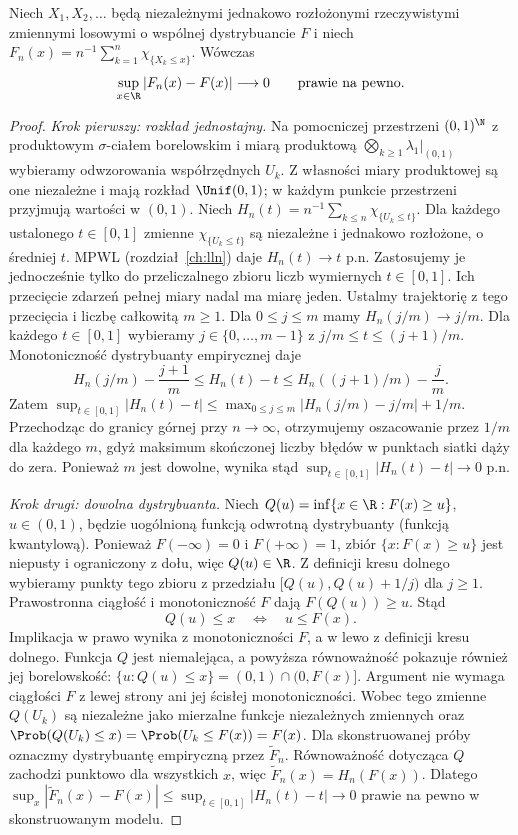 \begin{twierdzenie}
Niech $X_1,X_2,\ldots$ będą niezależnymi
jednakowo rozłożonymi rzeczywistymi zmiennymi losowymi
o wspólnej dystrybuancie $F$ i niech
$F_n(x)=n^{-1}\sum_{k=1}^n\chi_{\{X_k\leq x\}}$.
Wówczas
\[
\sup_{x\in\R}|F_n(x)-F(x)|\longrightarrow0
\qquad\text{prawie na pewno}.
\]
\end{twierdzenie}
\begin{proof}
\emph{Krok pierwszy: rozkład jednostajny.}
Na pomocniczej przestrzeni $(0,1)^{\N}$ z produktowym
$\sigma$-ciałem borelowskim i miarą produktową
$\bigotimes_{k\geq1}\lambda_1|_{(0,1)}$
wybieramy odwzorowania współrzędnych $U_k$.
Z własności miary produktowej są one niezależne
i mają rozkład $\Unif(0,1)$; w każdym punkcie
przestrzeni przyjmują wartości w $(0,1)$. Niech
$H_n(t)=n^{-1}\sum_{k\leq n}\chi_{\{U_k\leq t\}}$.
Dla każdego ustalonego $t\in[0,1]$ zmienne
$\chi_{\{U_k\leq t\}}$ są niezależne i jednakowo
rozłożone, o średniej $t$. MPWL
(rozdział~\ref{ch:lln}) daje $H_n(t)\to t$ p.n. Zastosujemy je
jednocześnie tylko do przeliczalnego zbioru
liczb wymiernych $t\in[0,1]$. Ich przecięcie
zdarzeń pełnej miary nadal ma miarę jeden.
Ustalmy trajektorię z tego przecięcia i
liczbę całkowitą $m\geq1$. Dla
$0\leq j\leq m$ mamy
$H_n(j/m)\to j/m$.
Dla każdego $t\in[0,1]$ wybieramy
$j\in\{0,\ldots,m-1\}$ z $j/m\leq t\leq(j+1)/m$.
Monotoniczność
dystrybuanty empirycznej daje
\[
H_n(j/m)-\frac{j+1}{m}\leq H_n(t)-t
\leq H_n((j+1)/m)-\frac{j}{m}.
\]
Zatem
$\sup_{t\in[0,1]}|H_n(t)-t|\leq
\max_{0\leq j\leq m}|H_n(j/m)-j/m|+1/m$.
Przechodząc do granicy górnej przy $n\to\infty$,
otrzymujemy oszacowanie przez $1/m$ dla każdego $m$,
gdyż maksimum skończonej liczby błędów w punktach
siatki dąży do zera.
Ponieważ $m$ jest dowolne, wynika stąd
$\sup_{t\in[0,1]}|H_n(t)-t|\to0$ p.n.

\emph{Krok drugi: dowolna dystrybuanta.}
Niech $Q(u)=\inf\{x\in\R:F(x)\geq u\}$,
$u\in(0,1)$, będzie uogólnioną funkcją odwrotną
dystrybuanty (funkcją kwantylową).
Ponieważ $F(-\infty)=0$ i $F(+\infty)=1$, zbiór
$\{x:F(x)\geq u\}$ jest niepusty i ograniczony z dołu,
więc $Q(u)\in\R$.
Z definicji kresu dolnego wybieramy punkty tego
zbioru z przedziału $[Q(u),Q(u)+1/j)$ dla $j\geq1$.
Prawostronna ciągłość i monotoniczność $F$ dają
$F(Q(u))\geq u$. Stąd
\[
Q(u)\leq x\quad\Longleftrightarrow\quad u\leq F(x).
\]
Implikacja w prawo wynika z monotoniczności $F$,
a w lewo z definicji kresu dolnego. Funkcja $Q$
jest niemalejąca, a powyższa równoważność
pokazuje również jej borelowskość:
$\{u:Q(u)\leq x\}=(0,1)\cap(0,F(x)]$.
Argument nie wymaga ciągłości $F$ z lewej strony
ani jej ścisłej monotoniczności.
Wobec tego zmienne $Q(U_k)$ są niezależne jako
mierzalne funkcje niezależnych zmiennych oraz
$\Prob(Q(U_k)\leq x)=\Prob(U_k\leq F(x))=F(x)$.
Dla skonstruowanej próby oznaczmy dystrybuantę
empiryczną przez $\widetilde F_n$. Równoważność
dotycząca $Q$ zachodzi punktowo dla wszystkich $x$,
więc $\widetilde F_n(x)=H_n(F(x))$.
Dlatego
$\sup_x|\widetilde F_n(x)-F(x)|
\leq\sup_{t\in[0,1]}|H_n(t)-t|\to0$
prawie na pewno w skonstruowanym modelu.


\end{proof}
